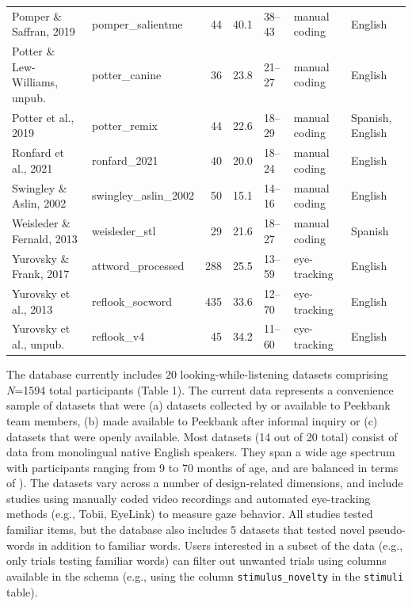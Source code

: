 \documentclass[
  english,
  man,floatsintext]{apa6}
\providecommand{\DIFaddtex}[1]{{\protect\color{blue}{#1}}} %
\providecommand{\DIFdeltex}[1]{}                      %
\providecommand{\DIFaddbegin}{} %
\providecommand{\DIFaddend}{} %
\providecommand{\DIFdelbegin}{} %
\providecommand{\DIFdelend}{} %
\providecommand{\DIFaddendFL}{} %
\providecommand{\DIFadd}[1]{\texorpdfstring{\DIFaddtex{#1}}{#1}} %
\providecommand{\DIFdel}[1]{\texorpdfstring{\DIFdeltex{#1}}{}} %
\newcommand{\DIFscaledelfig}{0.5}
\newlength{\DIFdelgraphicswidth} %
\newlength{\DIFdelgraphicsheight} %
\newcommand{\DIFaddincludegraphics}[2][]{{\color{blue}\fbox{\DIFOincludegraphics[#1]{#2}}}} %
\newcommand{\DIFdelincludegraphics}[2][]{%
\sbox{\DIFdelgraphicsbox}{\DIFOincludegraphics[#1]{#2}}%
\settoboxwidth{\DIFdelgraphicswidth}{\DIFdelgraphicsbox} %
\settoboxtotalheight{\DIFdelgraphicsheight}{\DIFdelgraphicsbox} %
\scalebox{\DIFscaledelfig}{%
\parbox[b]{\DIFdelgraphicswidth}{\usebox{\DIFdelgraphicsbox}\\[-\baselineskip] \rule{\DIFdelgraphicswidth}{0em}}\llap{\resizebox{\DIFdelgraphicswidth}{\DIFdelgraphicsheight}{%
\setlength{\unitlength}{\DIFdelgraphicswidth}%
\begin{picture}(1,1)%
\thicklines\linethickness{2pt} %
{\color[rgb]{1,0,0}\put(0,0){\framebox(1,1){}}}%
{\color[rgb]{1,0,0}\put(0,0){\line( 1,1){1}}}%
{\color[rgb]{1,0,0}\put(0,1){\line(1,-1){1}}}%
\end{picture}%
}\hspace*{3pt}}} %
} %
\DeclareRobustCommand{\DIFaddbegin}{\DIFOaddbegin \let\includegraphics\DIFaddincludegraphics} %
\DeclareRobustCommand{\DIFaddend}{\DIFOaddend \let\includegraphics\DIFOincludegraphics} %
\DeclareRobustCommand{\DIFdelbegin}{\DIFOdelbegin \let\includegraphics\DIFdelincludegraphics} %
\DeclareRobustCommand{\DIFdelend}{\DIFOaddend \let\includegraphics\DIFOincludegraphics} %
\DeclareRobustCommand{\DIFaddendFL}{\DIFOaddendFL \let\includegraphics\DIFOincludegraphics} %
\begin{document}
\begin{table}
{\begin{tabular}[t]{llrrlll}
Pomper \& Saffran, 2019 & pomper\_salientme & 44 & 40.1 & 38–43 & manual coding & English\\
Potter \& Lew-Williams, unpub. & potter\_canine & 36 & 23.8 & 21–27 & manual coding & English\\
Potter et al., 2019 & potter\_remix & 44 & 22.6 & 18–29 & manual coding & Spanish, English\\
Ronfard et al., 2021 & ronfard\_2021 & 40 & 20.0 & 18–24 & manual coding & English\\
Swingley \& Aslin, 2002 & swingley\_aslin\_2002 & 50 & 15.1 & 14–16 & manual coding & English\\
Weisleder \& Fernald, 2013 & weisleder\_stl & 29 & 21.6 & 18–27 & manual coding & Spanish\\
Yurovsky \& Frank, 2017 & attword\_processed & 288 & 25.5 & 13–59 & eye-tracking & English\\
Yurovsky et al., 2013 & reflook\_socword & 435 & 33.6 & 12–70 & eye-tracking & English\\
Yurovsky et al., unpub. & reflook\_v4 & 45 & 34.2 & 11–60 & eye-tracking & English\\
\bottomrule
\end{tabular}}
\DIFaddendFL \end{table}

The database currently includes 20 looking-while-listening datasets comprising \emph{N}=1594 total participants (Table 1).
The current data represents a convenience sample of datasets that were (a) datasets collected by or available to Peekbank team members, (b) made available to Peekbank after informal inquiry or (c) datasets that were openly available.
Most datasets (14 out of 20 total) consist of data from monolingual native English speakers.
They span a wide age spectrum with participants ranging from 9 to 70 months of age, and are balanced in terms of \DIFdelbegin \DIFdel{gender (47\% female}\DIFdelend \DIFaddbegin \DIFadd{children's assigned sex (47.30\% female; 50.40\% male; 2.30\% unreported}\DIFaddend ).
The datasets vary across a number of design-related dimensions, and include studies using manually coded video recordings and automated eye-tracking methods (e.g., Tobii, EyeLink) to measure gaze behavior.
All studies tested familiar items, but the database also includes 5 datasets that tested novel pseudo-words in addition to familiar words.
Users interested in a subset of the data (e.g., only trials testing familiar words) can filter out unwanted trials using columns available in the schema (e.g., using the column \texttt{stimulus\_novelty} in the \texttt{stimuli} table).
\end{document}
